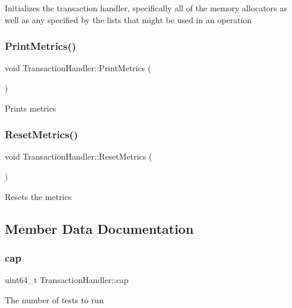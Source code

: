 Initializes the transaction handler, specifically all of the memory allocators as well as any specified by the lists that might be used in an operation \mbox{\label{classTransactionHandler_a2e87e8be283890fd847fd8fb120a5537}} 
\subsubsection{\texorpdfstring{Print\+Metrics()}{PrintMetrics()}}
{\footnotesize\ttfamily void Transaction\+Handler\+::\+Print\+Metrics (\begin{DoxyParamCaption}{ }\end{DoxyParamCaption})}

Prints metrics \mbox{\label{classTransactionHandler_af5fb6686d702424f7fa6cc5e94f5696c}} 
\subsubsection{\texorpdfstring{Reset\+Metrics()}{ResetMetrics()}}
{\footnotesize\ttfamily void Transaction\+Handler\+::\+Reset\+Metrics (\begin{DoxyParamCaption}{ }\end{DoxyParamCaption})}

Resets the metrics 

\subsection{Member Data Documentation}
\mbox{\label{classTransactionHandler_a2cf5ca7f79dbfed3c2a74524c510fce9}} 
\subsubsection{\texorpdfstring{cap}{cap}}
{\footnotesize\ttfamily uint64\+\_\+t Transaction\+Handler\+::cap}

The number of tests to run \mbox{\label{classTransactionHandler_a2ff242c44d06eb9fcceac93e703b377b}} 
